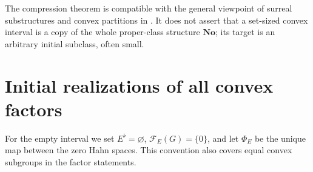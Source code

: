 \documentclass[11pt]{article}
\theoremstyle{definition}
\theoremstyle{remark}
\newcommand{\No}{\ensuremath{\mathbf{No}}}
\begin{document}
The compression theorem is compatible with the general viewpoint of
surreal substructures and convex partitions in \cite{BagHoeven}.
It does not assert that a set-sized convex interval is a copy of the
whole proper-class structure $\No$; its target is an arbitrary initial
subclass, often small.

\section{Initial realizations of all convex factors}\label{isg:cf:sec:factors}

For the empty interval we set $E^\flat=\varnothing$,
$\mathcal F_E(G)=\{0\}$, and let $\Phi_E$ be the unique map between
the zero Hahn spaces. This convention also covers equal convex subgroups
in the factor statements.
\end{document}
